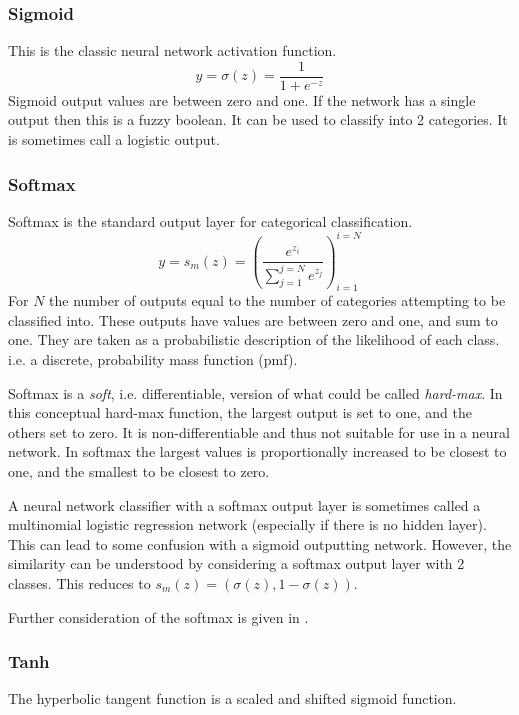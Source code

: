 \documentclass[12pt,parskip]{komatufte}
\begin{document}
\subsubsection{Sigmoid}
This is the classic neural network activation function.
\begin{equation}
y=\sigma(z)=\frac{1}{1+e^{-z}}
\end{equation}
Sigmoid output values are between zero and one.
If the network has a single output then this is a fuzzy boolean.
It can be used to classify into 2 categories.
It is sometimes call a logistic output.

\subsubsection{Softmax}
Softmax is the standard output layer for categorical classification.
\begin{equation}
y=s_m(z)=\left( \frac{e^{z_i}}{\sum_{j=1}^{j=N} e^{z_j}} \right)_{i=1}^{i=N}
\end{equation}
For $N$ the number of outputs equal to the number of categories attempting to be classified into.
These outputs have  values are between zero and one, and sum to one.
They are taken as a probabilistic description of the likelihood of each class.
i.e. a discrete, probability mass function (pmf).


Softmax is a \emph{soft}, i.e. differentiable,  version of what could be called \emph{hard-max}.
In this conceptual hard-max function, the largest output is set to one, and the others set to zero.
It is non-differentiable and thus not suitable for use in a neural network.
In softmax the largest values is proportionally increased to be closest to one,
and the smallest to be closest to zero.

A neural network classifier with a softmax output layer is sometimes called a multinomial logistic regression network (especially if there is no hidden layer).
This can lead to some confusion with a sigmoid outputting network.
However, the similarity can be understood by considering a softmax output layer with 2 classes.
This reduces to $s_m(z)= \left( \sigma(z), 1-\sigma(z) \right)$.

Further consideration of the softmax is given in .

\subsubsection{Tanh}
The hyperbolic tangent function is a  scaled and shifted sigmoid function.
\end{document}
